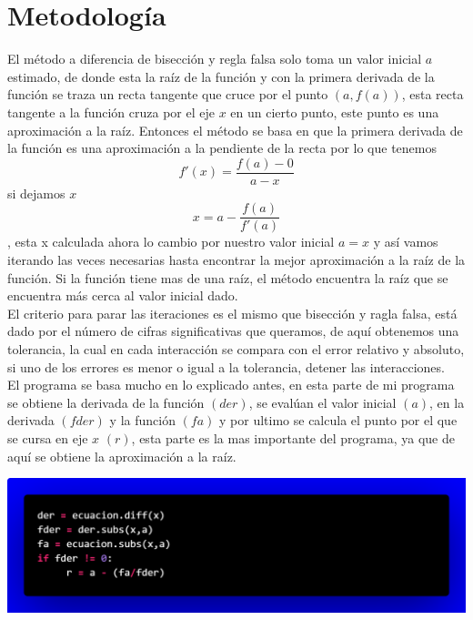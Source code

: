 \documentclass[12pt]{article}
\begin{document}
		\section*{\centering Metodología}\label{sec:Metodologia}
			El método a diferencia de bisección y regla falsa solo toma un valor inicial $ a $ estimado, de donde 
			esta la raíz de la función y con la primera derivada de la función se traza un recta tangente que cruce 
			por el punto $ (a,f(a)) $, esta recta tangente a la función cruza por el eje $ x $ en un cierto punto, 
			este punto es una aproximación a la raíz. Entonces el método se basa en que la primera derivada de 
			la función es una aproximación a la pendiente de la recta por lo que tenemos $$ f'(x) = \frac{f(a)-0}{a-x} $$ 
			si dejamos $ x $ $$ x = a - \frac{f(a)}{f'(a)} $$, esta x calculada ahora lo cambio por nuestro valor 
			inicial $ a = x $ y así vamos iterando las veces necesarias hasta encontrar la mejor aproximación a la 
			raíz de la función. Si la función tiene mas de una raíz, el método encuentra la raíz que se encuentra 
			más cerca al valor inicial dado. \\
			El criterio para parar las iteraciones es el mismo que bisección y ragla falsa, está dado por el número de cifras 
			significativas que queramos, de aquí obtenemos una tolerancia, la cual en cada interacción se 
			compara con el error relativo y absoluto, si uno de los errores es menor o igual a la tolerancia, 
			detener las interacciones.\\
			El programa se basa mucho en lo explicado antes, en esta parte de mi programa se obtiene la 
			derivada de la función $ (der) $, se evalúan el valor inicial $ (a) $, en la derivada $ (fder) $ y la función $ (fa) $ 
			y por ultimo se calcula el punto por el que se cursa en eje $ x $ $ (r) $, esta parte es la mas 
			importante del programa, ya que de aquí se obtiene la aproximación a la raíz.
			\begin{center}
				\includegraphics[width=\linewidth]{Figura 1.png} 				
			\end{center}
		
\end{document}
